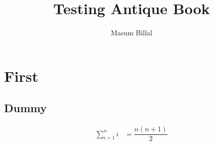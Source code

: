 \documentclass{antique_book}
\author{Masum Billal}
\title{Testing Antique Book}
\begin{document}
	\frontmatter
	\maketitle
	\tableofcontents
	\mainmatter
	\chapter{First}
	\section{Dummy}
	\lipsum
		\begin{align*}
			\sum_{i=1}^{n}i
				& = \dfrac{n(n+1)}{2}
		\end{align*}
\end{document}
